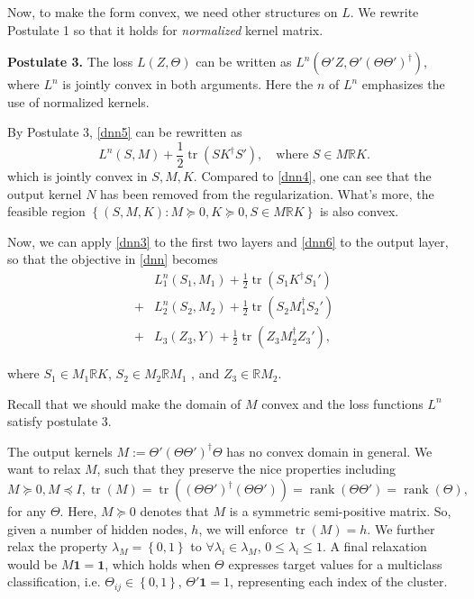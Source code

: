 \documentclass{article}
\DeclareMathOperator{\tr}{tr}
\DeclareMathOperator{\rank}{rank}
\begin{document}
Now, to make the form convex, we need other structures on $L$. We rewrite Postulate 1 so that it holds for \emph{normalized} kernel matrix.

\textbf{Postulate 3.} The loss $L(Z,\Theta)$ can be written as $L^n(\Theta'Z,\Theta'(\Theta\Theta')^\dagger)$, where $L^n$ is jointly convex
in both arguments. Here the $n$ of $L^n$ emphasizes the use of normalized kernels.

By Postulate 3, \eqref{dnn5} can be rewritten as
\begin{equation}\label{dnn6}
L^n(S,M)+\frac{1}{2}\tr(SK^\dagger S'),\quad\text{where }S\in M\mathbb{R}K.
\end{equation}
which is jointly convex in $S,M,K$. Compared to \eqref{dnn4}, one can see that the output kernel $N$ has been removed from the regularization. What's more, the feasible region $\left\lbrace (S,M,K):M\succeq0,K\succeq0,S\in M\mathbb{R}K\right\rbrace$ is also convex.

Now, we can apply \eqref{dnn3} to the first two layers and \eqref{dnn6} to the output layer, so that the objective in \eqref{dnn} becomes
\begin{equation}\label{obj}
	\begin{aligned}
	&L_1^n(S_1,M_1)+\frac{1}{2}\tr(S_1K^\dagger S_1')\\
	+&L_2^n(S_2,M_2)+\frac{1}{2}\tr(S_2M_1^\dagger S_2')\\
	+&L_3(Z_3,Y)+\frac{1}{2}\tr(Z_3M_2^\dagger Z_3'),
	\end{aligned}
\end{equation}

where $S_1\in M_1\mathbb{R}K$, $S_2\in M_2\mathbb{R}M_1$ , and $Z_3\in \mathbb{R}M_2$.

Recall that we should make the domain of $M$ convex and the loss functions $L^n$ satisfy postulate 3.

The output kernels $M:=\Theta'(\Theta\Theta')^\dagger\Theta$ has no convex domain in general. We want to relax $M$, such that they preserve the nice properties including
\[M\succeq0,M\preceq I,\tr(M)=\tr((\Theta\Theta')^\dagger(\Theta\Theta'))=\rank(\Theta\Theta')=\rank(\Theta),\]
for any $\Theta$. Here, $M\succeq0$ denotes that $M$ is a symmetric semi-positive matrix. So, given a number of hidden nodes, $h$, we will enforce $\tr(M)=h$. We further relax the property $\lambda_{M}=\left\lbrace 0,1\right\rbrace $ to $\forall \lambda_i\in\lambda_{M}$, $0\leq \lambda_i\leq 1$. A final relaxation would be $M\mathbf{1}=\mathbf{1}$, which holds when $\Theta$ expresses target values for a multiclass classification, i.e. $\Theta_{ij}\in\left\lbrace 0,1\right\rbrace$, $\Theta'\mathbf{1}=1$, representing each index of the cluster.
\end{document}
